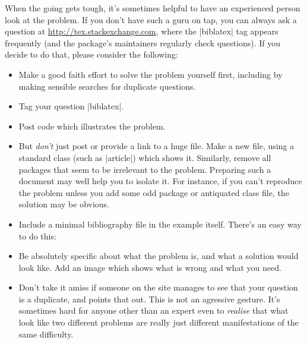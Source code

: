 When the going gets tough, it's sometimes helpful to have an
experienced person look at the problem. If you don't have such a guru
on tap, you can always ask a question at
\url{http://tex.stackexchange.com}, where the |biblatex| tag appears
frequently (and the package's maintainers regularly check
questions). If you decide to do that, please consider the following:
\begin{itemize}
\item Make a good faith effort to solve the problem yourself first,
  including by making sensible searches for duplicate questions.
\item Tag your question |biblatex|.
\item Post code which illustrates the problem.
\item But \emph{don't} just post or provide a link to a huge
  file. Make a new file, using a standard class (such as |article|)
  which shows it. Similarly, remove all packages that seem to be
  irrelevant to the problem. Preparing such a document may well help
  you to isolate it. For instance, if you can't reproduce the problem
  unless you add some odd package or antiquated class file, the
  solution may be obvious.
\item Include a minimal bibliography file in the example
  itself. There's an easy way to do this:
\item Be absolutely specific about what the problem is, and what a
  solution would look like. Add an image which shows what is wrong and
  what you need.
\item Don't take it amiss if someone on the site manages to see that
  your question is a duplicate, and points that out. This is not an
  agressive gesture. It's sometimes hard for anyone other than an
  expert even to \emph{realise} that what look like two different
  problems are really just different manifestations of the same
  difficulty.
\end{itemize}

